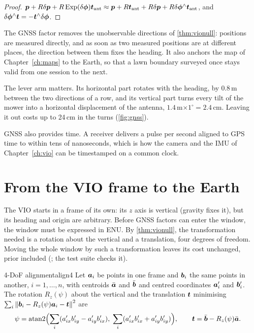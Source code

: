 \begin{proof}
$\bm{p}+R\delta\bm{p}+R\operatorname{Exp}(\delta\bm{\phi})\bm{t}_{\mathrm{ant}}\approx\bm{p}+R
\bm{t}_{\mathrm{ant}}+R\delta\bm{p}+R\delta\bm{\phi}^{\wedge}\bm{t}_{\mathrm{ant}}$,
and $\delta\bm{\phi}^{\wedge}\bm{t}=-\bm{t}^{\wedge}\delta\bm{\phi}$.
\end{proof}

The GNSS factor removes the unobservable directions of
\cref{thm:vionull}: positions are measured directly, and as soon as two
measured positions are at different places, the direction between them
fixes the heading. It also anchors the map of Chapter~\ref{ch:maps} to the
Earth, so that a lawn boundary surveyed once stays valid from one
session to the next.

The lever arm matters. Its horizontal part rotates with the heading,
by $0.8$\,m between the two directions of a row, and its vertical part
turns every tilt of the mower into a horizontal displacement of the
antenna, $1.4$\,m$\times1^\circ=2.4$\,cm. Leaving it out costs up to
24\,cm in the turns (\cref{fig:gnss}).

GNSS also provides time. A receiver delivers a pulse per second aligned
to GPS time to within tens of nanoseconds, which is how the camera and
the IMU of Chapter~\ref{ch:vio} can be timestamped on a common clock.

\section{From the VIO frame to the Earth}

The VIO starts in a frame of its own: its $z$ axis is vertical (gravity
fixes it), but its heading and origin are arbitrary. Before GNSS factors
can enter the window, the window must be expressed in ENU. By
\cref{thm:vionull}, the transformation needed is a rotation about the
vertical and a translation, four degrees of freedom. Moving the whole
window by such a transformation leaves its cost unchanged, prior
included (; the test suite checks it).

\begin{proposition}{4-DoF alignment}{align4}
Let $\bm{a}_i$ be points in one frame and $\bm{b}_i$ the same points
in another, $i=1,\dots,n$, with centroids $\bar{\bm{a}}$ and
$\bar{\bm{b}}$ and centred coordinates $\bm{a}_i'$ and $\bm{b}_i'$.
The rotation $R_z(\psi)$ about the vertical and the translation
$\bm{t}$ minimising $\sum_i\left\lVert \bm{b}_i-R_z(\psi)\bm{a}_i-
\bm{t}\right\rVert^2$ are
\begin{equation}\label{eq:align4}
\psi=\operatorname{atan2}\Bigl(\sum_i(a'_{ix}b'_{iy}-a'_{iy}b'_{ix}),\;
\sum_i(a'_{ix}b'_{ix}+a'_{iy}b'_{iy})\Bigr),\qquad
\bm{t}=\bar{\bm{b}}-R_z(\psi)\bar{\bm{a}}.
\end{equation}
\end{proposition}

